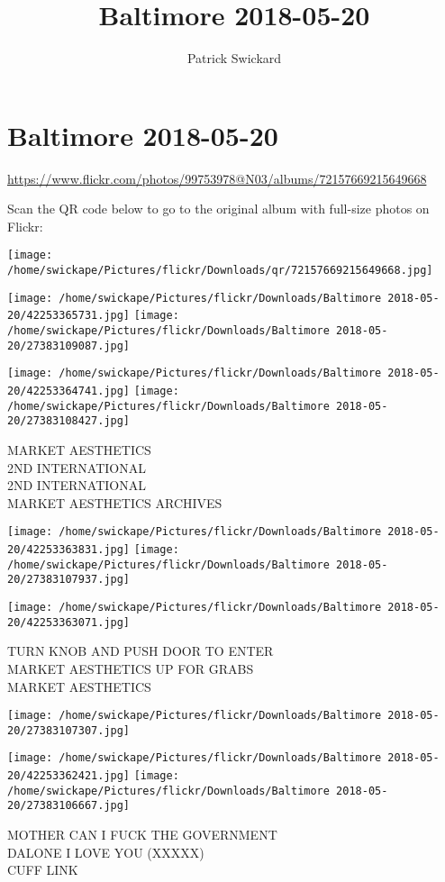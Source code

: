 \documentclass[10pt,letterpaper]{article}
\title{Baltimore 2018-05-20}
\author{Patrick Swickard}
\date{}
\begin{document}
\section*{Baltimore 2018-05-20}

\url{https://www.flickr.com/photos/99753978@N03/albums/72157669215649668}

Scan the QR code below to go to the original album with full-size photos on Flickr:

\texttt{[image: /home/swickape/Pictures/flickr/Downloads/qr/72157669215649668.jpg]}
\pagebreak

\texttt{[image: /home/swickape/Pictures/flickr/Downloads/Baltimore 2018-05-20/42253365731.jpg]}
\texttt{[image: /home/swickape/Pictures/flickr/Downloads/Baltimore 2018-05-20/27383109087.jpg]}

\texttt{[image: /home/swickape/Pictures/flickr/Downloads/Baltimore 2018-05-20/42253364741.jpg]}
\texttt{[image: /home/swickape/Pictures/flickr/Downloads/Baltimore 2018-05-20/27383108427.jpg]}

MARKET AESTHETICS\\
2ND INTERNATIONAL\\
2ND INTERNATIONAL\\
MARKET AESTHETICS ARCHIVES
\pagebreak

\texttt{[image: /home/swickape/Pictures/flickr/Downloads/Baltimore 2018-05-20/42253363831.jpg]}
\texttt{[image: /home/swickape/Pictures/flickr/Downloads/Baltimore 2018-05-20/27383107937.jpg]}

\texttt{[image: /home/swickape/Pictures/flickr/Downloads/Baltimore 2018-05-20/42253363071.jpg]}

TURN KNOB AND PUSH DOOR TO ENTER\\
MARKET AESTHETICS UP FOR GRABS\\
MARKET AESTHETICS
\pagebreak

\texttt{[image: /home/swickape/Pictures/flickr/Downloads/Baltimore 2018-05-20/27383107307.jpg]}

\vspace{0.25in}
\texttt{[image: /home/swickape/Pictures/flickr/Downloads/Baltimore 2018-05-20/42253362421.jpg]}
\texttt{[image: /home/swickape/Pictures/flickr/Downloads/Baltimore 2018-05-20/27383106667.jpg]}

MOTHER CAN I FUCK THE GOVERNMENT\\
DALONE I LOVE YOU (XXXXX)\\
CUFF LINK
\pagebreak
\end{document}
